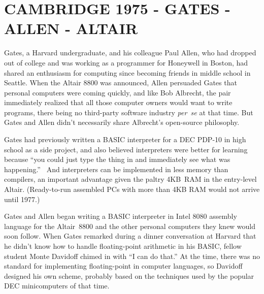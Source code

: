 
\section{CAMBRIDGE 1975 - GATES - ALLEN - ALTAIR}



Gates, a Harvard undergraduate, and his colleague 
Paul Allen, who
had dropped out of college and was working as a programmer for Honeywell
in Boston, had shared an enthusiasm for computing since becoming
friends in middle school in Seattle.
When the Altair 8800 was announced,
Allen persuaded Gates that personal computers were coming quickly, and
like Bob Albrecht, the pair immediately realized that all those
computer owners would want to write programs, there being no third-party
software industry \emph{per~se}\/ at that time.
But Gates and Allen didn't necessarily share Albrecht's open-source
philosophy.   

Gates had
previously written a BASIC interpreter for  a DEC PDP-10 in high school
as a side project, and also believed interpreters were better for
learning because
``you could just type
the thing in and immediately see what was
happening.''~\cite{smithsonian_interview} 
And interpreters can be implemented in less memory than compilers,
an important advantage given the paltry 4KB~RAM in the entry-level  Altair.
(Ready-to-run assembled PCs with more than 4KB RAM would not arrive until 1977.)

Gates and Allen began writing a BASIC interpreter in Intel 8080
assembly language for the
Altair~8800 and the other personal computers they
knew would soon follow.
When Gates remarked during a dinner conversation at Harvard
that he didn't know how to handle floating-point arithmetic in his
BASIC, fellow student Monte Davidoff chimed in with ``I can do that.''
At the time, there was no standard for implementing floating-point in
computer languages, so Davidoff designed his own scheme, probably based
on the techniques used by the popular DEC minicomputers of that time.

